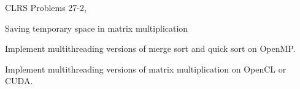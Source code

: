 \begin{homeworkProblem}

CLRS Problems 27-2,

Saving temporary space in matrix multiplication

\problemAnswer{
}
\end{homeworkProblem}





\begin{homeworkProblem}

Implement multithreading versions of merge sort and quick sort on OpenMP.

\problemAnswer{
}
\end{homeworkProblem}






\begin{homeworkProblem}

Implement multithreading versions of matrix multiplication on OpenCL or CUDA.

\problemAnswer{
}
\end{homeworkProblem}



